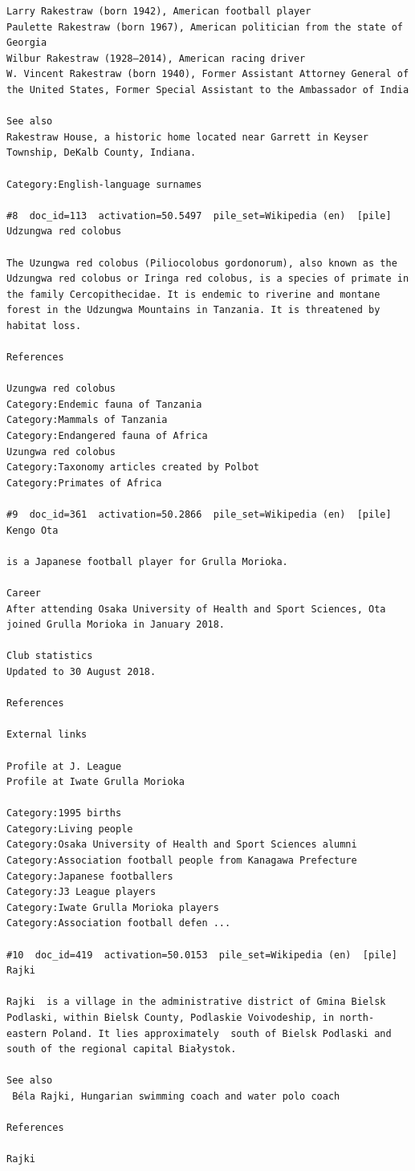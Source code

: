 \begin{verbatim}
Larry Rakestraw (born 1942), American football player
Paulette Rakestraw (born 1967), American politician from the state of Georgia
Wilbur Rakestraw (1928–2014), American racing driver
W. Vincent Rakestraw (born 1940), Former Assistant Attorney General of the United States, Former Special Assistant to the Ambassador of India

See also
Rakestraw House, a historic home located near Garrett in Keyser Township, DeKalb County, Indiana.

Category:English-language surnames

#8  doc_id=113  activation=50.5497  pile_set=Wikipedia (en)  [pile]
Udzungwa red colobus

The Uzungwa red colobus (Piliocolobus gordonorum), also known as the Udzungwa red colobus or Iringa red colobus, is a species of primate in the family Cercopithecidae. It is endemic to riverine and montane forest in the Udzungwa Mountains in Tanzania. It is threatened by habitat loss.

References

Uzungwa red colobus
Category:Endemic fauna of Tanzania
Category:Mammals of Tanzania
Category:Endangered fauna of Africa
Uzungwa red colobus
Category:Taxonomy articles created by Polbot
Category:Primates of Africa

#9  doc_id=361  activation=50.2866  pile_set=Wikipedia (en)  [pile]
Kengo Ota

is a Japanese football player for Grulla Morioka.

Career
After attending Osaka University of Health and Sport Sciences, Ota joined Grulla Morioka in January 2018.

Club statistics
Updated to 30 August 2018.

References

External links

Profile at J. League
Profile at Iwate Grulla Morioka

Category:1995 births
Category:Living people
Category:Osaka University of Health and Sport Sciences alumni
Category:Association football people from Kanagawa Prefecture
Category:Japanese footballers
Category:J3 League players
Category:Iwate Grulla Morioka players
Category:Association football defen ...

#10  doc_id=419  activation=50.0153  pile_set=Wikipedia (en)  [pile]
Rajki

Rajki  is a village in the administrative district of Gmina Bielsk Podlaski, within Bielsk County, Podlaskie Voivodeship, in north-eastern Poland. It lies approximately  south of Bielsk Podlaski and  south of the regional capital Białystok.

See also
 Béla Rajki, Hungarian swimming coach and water polo coach

References

Rajki

\end{verbatim}

